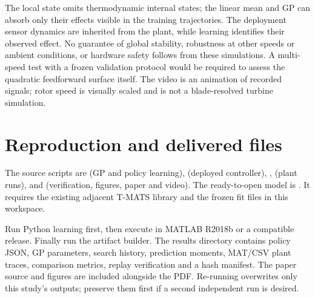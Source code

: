The local state omits thermodynamic internal states; the linear mean and GP can absorb only their effects visible in the training trajectories. The deployment sensor dynamics are inherited from the plant, while learning identifies their observed effect. No guarantee of global stability, robustness at other speeds or ambient conditions, or hardware safety follows from these simulations. A multi-speed test with a frozen validation protocol would be required to assess the quadratic feedforward surface itself. The video is an animation of recorded signals; rotor speed is visually scaled and is not a blade-resolved turbine simulation.

\section{Reproduction and delivered files}
The source scripts are  (GP and policy learning),  (deployed controller), ,  (plant runs), and  (verification, figures, paper and video). The ready-to-open model is . It requires the existing adjacent T-MATS library and the frozen fit files in this workspace.

Run Python learning first, then execute  in MATLAB R2018b or a compatible release. Finally run the artifact builder. The results directory contains policy JSON, GP parameters, search history, prediction moments, MAT/CSV plant traces, comparison metrics, replay verification and a hash manifest. The paper source and figures are included alongside the PDF. Re-running overwrites only this study's outputs; preserve them first if a second independent run is desired.

